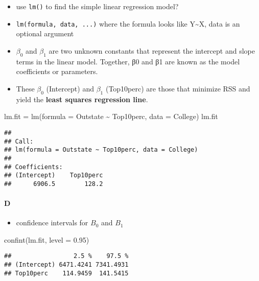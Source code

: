 \documentclass[
]{article}
\newenvironment{Shaded}{\begin{snugshade}}{\end{snugshade}}
\newcommand{\AttributeTok}[1]{\textcolor[rgb]{0.77,0.63,0.00}{#1}}
\newcommand{\FloatTok}[1]{\textcolor[rgb]{0.00,0.00,0.81}{#1}}
\newcommand{\FunctionTok}[1]{\textcolor[rgb]{0.00,0.00,0.00}{#1}}
\newcommand{\NormalTok}[1]{#1}
\newcommand{\OtherTok}[1]{\textcolor[rgb]{0.56,0.35,0.01}{#1}}
\newcommand{\SpecialCharTok}[1]{\textcolor[rgb]{0.00,0.00,0.00}{#1}}
\providecommand{\tightlist}{%
  \setlength{\itemsep}{0pt}\setlength{\parskip}{0pt}}
\begin{document}
\begin{itemize}
\tightlist
\item
  use \texttt{lm()} to find the simple linear regression model?
\item
  \texttt{lm(formula,\ data,\ ...)} where the formula looks like
  Y\textasciitilde X, data is an optional argument
\item
  \(β_0\) and \(β_1\) are two unknown constants that represent the
  intercept and slope terms in the linear model. Together, β0 and β1 are
  known as the model coefficients or parameters.
\item
  These \(𝛽_0\) (Intercept) and \(𝛽_1\) (Top10perc) are those that
  minimize RSS and yield the \textbf{least squares regression line}.
\end{itemize}

\begin{Shaded}
\begin{Highlighting}[]
\NormalTok{lm.fit }\OtherTok{=} \FunctionTok{lm}\NormalTok{(}\AttributeTok{formula =}\NormalTok{ Outstate }\SpecialCharTok{\textasciitilde{}}\NormalTok{ Top10perc, }\AttributeTok{data =}\NormalTok{ College)}
\NormalTok{lm.fit}
\end{Highlighting}
\end{Shaded}

\begin{verbatim}
## 
## Call:
## lm(formula = Outstate ~ Top10perc, data = College)
## 
## Coefficients:
## (Intercept)    Top10perc  
##      6906.5        128.2
\end{verbatim}

\hypertarget{d}{%
\paragraph{D}\label{d}}

\begin{itemize}
\tightlist
\item
  confidence intervals for \(B_0\) and \(B_1\)
\end{itemize}

\begin{Shaded}
\begin{Highlighting}[]
\FunctionTok{confint}\NormalTok{(lm.fit, }\AttributeTok{level =} \FloatTok{0.95}\NormalTok{)}
\end{Highlighting}
\end{Shaded}

\begin{verbatim}
##                 2.5 %    97.5 %
## (Intercept) 6471.4241 7341.4931
## Top10perc    114.9459  141.5415
\end{verbatim}
\end{document}

